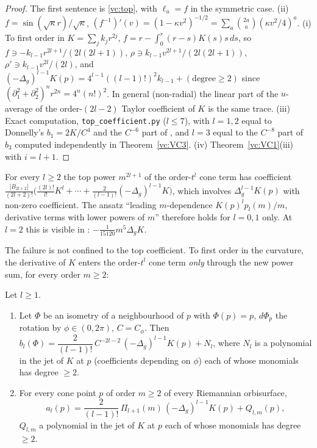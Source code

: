 \begin{proof}
The first sentence is \eqref{vc:top}, with $\ell_u=f$ in the symmetric case. (ii) $f=\sin(\sqrt\kappa
r)/\sqrt\kappa$, $(f^{-1})'(v)=(1-\kappa v^2)^{-1/2}=\sum_a\binom{2a}a(\kappa v^2/4)^a$. (i) To first order in
$K=\sum_jk_jr^{2j}$, $f=r-\int_0^r(r-s)K(s)s\,ds$, so $f\ni-k_{l-1}r^{2l+1}/(2l(2l+1))$,
$\rho\ni k_{l-1}v^{2l+1}/(2l(2l+1))$, $\rho'\ni k_{l-1}v^{2l}/(2l)$, and
$(-\Delta_g)^{l-1}K(p)=4^{l-1}((l-1)!)^2k_{l-1}+(\text{degree}\ge2)$ since
$(\partial_1^2+\partial_2^2)^{n}r^{2n}=4^n(n!)^2$. In general (non-radial) the linear part of the
$u$-average of the order-$(2l-2)$ Taylor coefficient of $K$ is the same trace. (iii) Exact computation,
\texttt{top\_coefficient.py} ($l\le7$), with $l=1,2$ equal to Donnelly's $b_1=2K/C^4$
\cite[Rem.~3.2]{schueth2019} and the $C^{-6}$ part of \cite[Thm~3.7]{schueth2019}, and $l=3$ equal to the
$C^{-8}$ part of $b_3$ computed independently in Theorem~\ref{vc:VC3}. (iv) Theorem~\ref{vc:VC1}(iii) with
$i=l+1$.
\end{proof}

\begin{corollary}\label{vc:fail}
For every $l\ge2$ the top power $m^{2l+1}$ of the order-$t^l$ cone term has coefficient
$\frac{|B_{2l+2}|}{(2l+2)!}\bigl(\frac{(2l)!}{l!}K^l+\cdots+\frac{2}{(l-1)!}(-\Delta_g)^{l-1}K\bigr)$, which involves
$\Delta_g^{l-1}K(p)$ with non-zero coefficient. The ansatz ``leading $m$-dependence $K(p)^lp_l(m)/m$, derivative
terms with lower powers of $m$'' therefore holds for $l=0,1$ only. At $l=2$ this is visible in
\cite[Thm~4.1]{schueth2019}: $-\frac1{15120}m^5\Delta_gK$.
\end{corollary}

The failure is not confined to the top coefficient. To first order in the curvature, the derivative of
$K$ enters the order-$t^l$ cone term \emph{only} through the new power sum, for every order $m\ge2$:

\begin{theorem}\label{vc:VC7}
Let $l\ge1$.
\begin{enumerate}[label=(\roman*)]
\item Let $\Phi$ be an isometry of a neighbourhood of $p$ with $\Phi(p)=p$, $d\Phi_p$ the rotation by
$\phi\in(0,2\pi)$, $C=C_\phi$. Then
$b_l(\Phi)=\dfrac{2}{(l-1)!}\,C^{-2l-2}\,(-\Delta_g)^{l-1}K(p)+N_l$, where $N_l$ is a polynomial in the jet of $K$
at $p$ (coefficients depending on $\phi$) each of whose monomials has degree $\ge2$.
\item For every cone point $p$ of order $m\ge2$ of every Riemannian orbisurface,
\[
a_l(p)=\frac{2}{(l-1)!}\,\Pi_{l+1}(m)\,(-\Delta_g)^{l-1}K(p)+Q_{l,m}(p),
\]
$Q_{l,m}$ a polynomial in the jet of $K$ at $p$ each of whose monomials has degree $\ge2$.
\end{enumerate}
\end{theorem}

